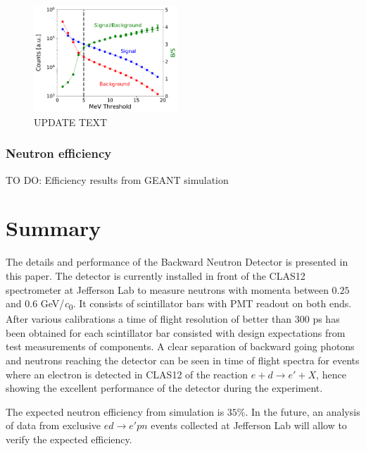 \documentclass[3p,final,twocolumn]{elsarticle}
\begin{document}
\begin{figure}[tb]
	\centering
		\includegraphics[width=0.48\textwidth]{signalbackgroundratio.pdf}
	\caption{UPDATE TEXT }
	\label{fig:signalbackground}
\end{figure}
\subsubsection{Neutron efficiency}
TO DO: Efficiency results from GEANT simulation




\section{Summary}
The details and performance of the Backward Neutron Detector is presented in this paper. The detector is currently installed in front of the CLAS12 spectrometer at Jefferson Lab to measure neutrons with momenta between $0.25$ and $0.6$ \si{\GeV/\clight}.  It consists of scintillator bars with PMT readout on both ends.
After various calibrations a time of flight resolution of better than 300 \si{\pico\s} has been obtained for each scintillator bar consisted with design expectations from test measurements of components. A clear separation of backward going photons and neutrons reaching the detector can be seen in time of flight spectra for events where an electron is detected in CLAS12 of the reaction $e+d \rightarrow e'+X$, hence showing the excellent performance of the detector during the experiment.

The expected neutron efficiency from simulation is $35$\%. In the future, an analysis of data from exclusive $ed \rightarrow e'pn$ events collected at Jefferson Lab will allow to verify the expected efficiency.

\end{document}
